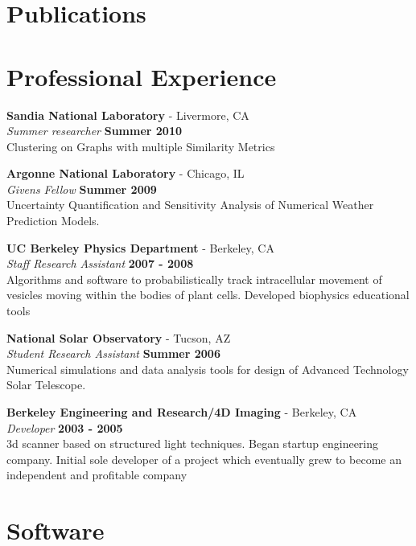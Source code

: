 \documentclass[margin,line]{res}
\begin{document}
\begin{resume}
\section{\sc Publications}



\section{\sc Professional Experience}

{\bf Sandia National Laboratory } - Livermore, CA\\
{\em Summer researcher} \hfill {\bf Summer 2010}\\
Clustering on Graphs with multiple Similarity Metrics 

{\bf Argonne National Laboratory} - Chicago, IL\\
{\em Givens Fellow} \hfill {\bf Summer 2009}\\
Uncertainty Quantification and Sensitivity Analysis of Numerical Weather Prediction Models.

{\bf UC Berkeley Physics Department} - Berkeley, CA\\
{\em Staff Research Assistant} \hfill {\bf 2007 - 2008}\\
Algorithms and software to probabilistically track intracellular movement of vesicles moving within the bodies of plant cells. Developed biophysics educational tools

{\bf National Solar Observatory} - Tucson, AZ\\
{\em Student Research Assistant} \hfill {\bf Summer 2006}\\
Numerical simulations and data analysis tools for design of Advanced Technology Solar Telescope.

{\bf Berkeley Engineering and Research/4D Imaging} - Berkeley, CA\\
{\em Developer} \hfill {\bf 2003 - 2005}\\
3d scanner based on structured light techniques. Began startup engineering company. Initial sole developer of a project which eventually grew to become an independent and profitable company

\section{\sc Software}




\end{resume}
\end{document}
